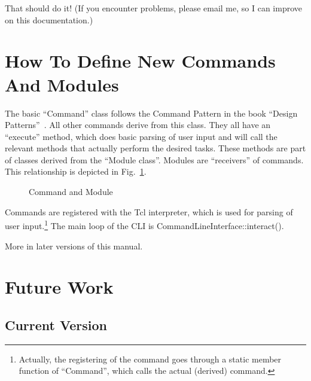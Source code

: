 \documentclass[12pt]{article}
\def\displayepsf#1#2#3#4{ %
   \begin{figure}[#1]
   \setlength{\epsfysize}{#3in}
   \centerline{\epsffile{#2}}
   \caption{#4}
   \end{figure}}
\begin{document}
That should do it! (If you encounter problems, please email me, so I can
improve on this documentation.)


\section{How To Define New Commands And Modules}
\label{sec:NewCommandsAndModules}

The basic ``Command'' class follows the Command Pattern
in the book ``Design Patterns''~\cite{DesignPatterns}. All other
commands derive from this class. They all have an ``execute'' method,
which does basic parsing of user input and will call the relevant
methods that actually perform the desired tasks. These methods are part
of classes derived from the ``Module class''. Modules are ``receivers''
of commands.  This relationship is depicted in
Fig.~\ref{fig:CommandsAndModules}.
%
\displayepsf{ht}{Command.eps}{2.4}{Command and
Module\label{fig:CommandsAndModules}}

Commands are registered with the Tcl interpreter, which is used for
parsing of user input.\footnote{Actually, the registering of the command goes
through a static member function of ``Command'', which calls the actual
(derived) command.} The main loop of the CLI is
CommandLineInterface::interact().

More in later versions of this manual.


\section{Future Work}
\label{sec:FutureWork}

\subsection{Current Version}
\label{sec:CurrentVersion}
\end{document}
